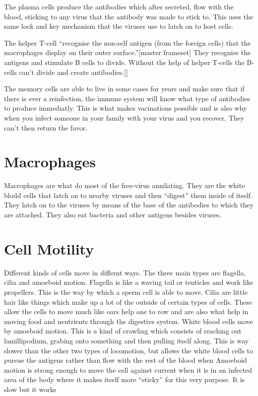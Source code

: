\documentclass[12pt ]{report}
\begin{document}
The plasma cells produce the antibodies which after secreted, flow with the blood, sticking to any virus that the antibody was made to stick to.  This uses the same lock and key mechanism that the viruses use to latch on to host cells.

The helper T-cell "`recognise the non-self antigen (from the foreign cells) that the macrophages display on their outer surface."'[master frameset]  They recognise the antigens and stimulate B cells to divide.  Without the help of helper T-cells the B-cells can't divide and create antibodies.[]

The memory cells are able to live in some cases for years and make sure that if there is ever a reinfection, the immune system will know what type of antibodies to produce immediatly.  This is what makes vacinations possible and is also why when you infect someone in your family with your virus and you recover, They can't then return the favor.
\section*{Macrophages}
Macrophages are what do most of the free-virus annilating.  They are the white blodd cells that latch on to nearby viruses and then "`digest"' them inside of itself.  They latch on to the viruses by means of the base of the antibodies to which they are attached.  They also eat bacteria and other antigens besides viruses.
\section*{Cell Motility}
Different kinds of cells move in differnt ways.  The three main types are flagella, cilia and amoeboid motion.  Flagella is like a waving tail or tenticles and work like propellers.  This is the way by which a sperm cell is able to move.  Cilia are little hair like things which make up a lot of the outside of certain types of cells.  These allow the cells to move much like oars help one to row and are also what help in moving food and neutrients through the digestive system.  White blood cells move by amoeboid motion.  This is a kind of crawling which consists of reaching out lamillipodium, grabing onto something and then pulling itself along.  This is way slower than the other two types of locomotion, but allows the white blood cells to pursue the antigens rather than flow with the rest of the blood when
Amoeboid motion is strong enough to move the cell against current when it is in an infected area of the body where it makes itself more "`sticky"' for this very purpose. It is slow but it works
\end{document}
